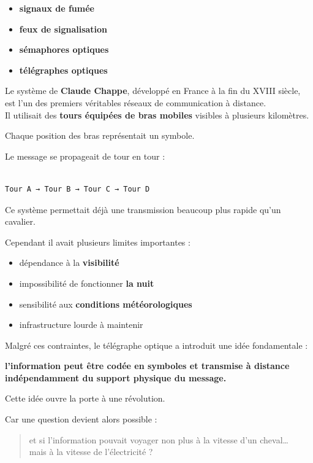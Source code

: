 \documentclass[
  french,
]{article}
\providecommand{\tightlist}{%
  \setlength{\itemsep}{0pt}\setlength{\parskip}{0pt}}
\begin{document}
\begin{itemize}
\tightlist
\item
  \textbf{signaux de fumée}
\item
  \textbf{feux de signalisation}
\item
  \textbf{sémaphores optiques}
\item
  \textbf{télégraphes optiques}
\end{itemize}

Le système de \textbf{Claude Chappe}, développé en France à la fin du
XVIII siècle, est l'un des premiers véritables réseaux de communication
à distance.\\
Il utilisait des \textbf{tours équipées de bras mobiles} visibles à
plusieurs kilomètres.

Chaque position des bras représentait un symbole.

Le message se propageait de tour en tour :

\begin{verbatim}

Tour A → Tour B → Tour C → Tour D
\end{verbatim}

Ce système permettait déjà une transmission beaucoup plus rapide qu'un
cavalier.

Cependant il avait plusieurs limites importantes :

\begin{itemize}
\tightlist
\item
  dépendance à la \textbf{visibilité}
\item
  impossibilité de fonctionner \textbf{la nuit}
\item
  sensibilité aux \textbf{conditions météorologiques}
\item
  infrastructure lourde à maintenir
\end{itemize}

Malgré ces contraintes, le télégraphe optique a introduit une idée
fondamentale :

\textbf{l'information peut être codée en symboles et transmise à
distance indépendamment du support physique du message.}

Cette idée ouvre la porte à une révolution.

Car une question devient alors possible :

\begin{quote}
et si l'information pouvait voyager non plus à la vitesse d'un
cheval\ldots{}\\
mais à la vitesse de l'électricité ?
\end{quote}
\end{document}
